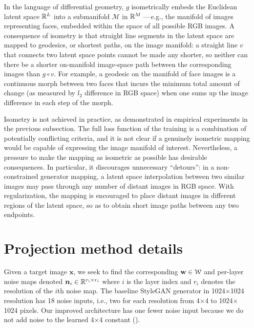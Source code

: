 In the language of differential geometry, $g$ isometrically embeds the Euclidean latent space $\mathbb{R}^L$ into a submanifold $\mathcal{M}$ in $\mathbb{R}^M$\,---\,e.g., the manifold of images representing faces, embedded within the space of all possible RGB images. A consequence of isometry is that straight line segments in the latent space are mapped to geodesics, or shortest paths, on the image manifold: a straight line $v$ that connects two latent space points cannot be made any shorter, so neither can there be a shorter on-manifold image-space path between the corresponding images than $g \circ v$. For example, a geodesic on the manifold of face images is a continuous morph between two faces that incurs the minimum total amount of change (as measured by $l_2$ difference in RGB space) when one sums up the image difference in each step of the morph.

Isometry is not achieved in practice, as demonstrated in empirical experiments in the previous subsection. The full loss function of the training is a combination of potentially conflicting criteria, and it is not clear if a genuinely isometric mapping would be capable of expressing the image manifold of interest. Nevertheless, a pressure to make the mapping as isometric as possible has desirable consequences. In particular, it discourages unnecessary ``detours'': in a non-constrained generator mapping, a latent space interpolation between two similar images may pass through any number of distant images in RGB space. With regularization, the mapping is encouraged to place distant images in different regions of the latent space, so as to obtain short image paths between any two endpoints.

\section{Projection method details} %
\label{app:projectiondetails}

\fignoiseregcars{} %

\newcommand{\imgsym}{\boldsymbol{x}}
\newcommand{\noisesym}{\boldsymbol{n}}
Given a target image $\imgsym$, we seek to find the corresponding ${\bf w} \in \mathcal{W}$ and per-layer noise maps denoted $\noisesym_i \in \real^{r_i \times r_i}$ where $i$ is the layer index and $r_i$ denotes the resolution of the $i$th noise map.
The baseline StyleGAN generator in 1024$\times$1024 resolution has 18 noise inputs, i.e., two for each resolution from 4$\times$4 to 1024$\times$1024 pixels.
Our improved architecture has one fewer noise input because we do not add noise to the learned 4$\times$4 constant ().

